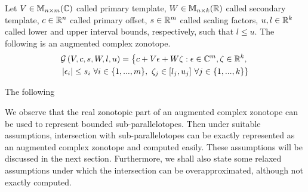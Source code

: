 \begin{definition}
Let $V\in\mathbb{M}_{n\times m}(\mathbb{C})$ called primary template, $W\in\mathbb{M}_{n\times k}(\mathbb{R})$
called secondary template, $c\in\mathbb{R}^n$ called primary offset,
$s\in\mathbb{R}^m$ called scaling factors, $u,l\in\mathbb{R}^k$ called lower
and upper interval bounds, respectively, such that $l\leq u$.  The
following is an augmented complex
zonotope.
\begin{multline}
\mathcal{G}\left(V,c,s,W,l,u\right) =
\left\{
  c+V\epsilon+W\zeta:\epsilon\in\mathbb{C}^m,\zeta\in\mathbb{R}^k,\right.\\ \left.  \left|\epsilon_i\right|\leq
 s_i~\forall i\in\{1,...,m\},~\zeta_j\in[l_j,u_j]~\forall j\in \{1,...,k\}
\right\}
\end{multline}
\end{definition}

The following 


We observe that the real zonotopic part of an augmented complex
zonotope can be used to represent bounded sub-parallelotopes.  Then
under suitable assumptions, intersection with sub-parallelotopes can
be exactly represented as an augmented complex zonotope and computed
easily.  These assumptions will be discussed in the next section.
Furthermore, we shall also state some relaxed assumptions under which
the intersection can be overapproximated, although not exactly
computed.



